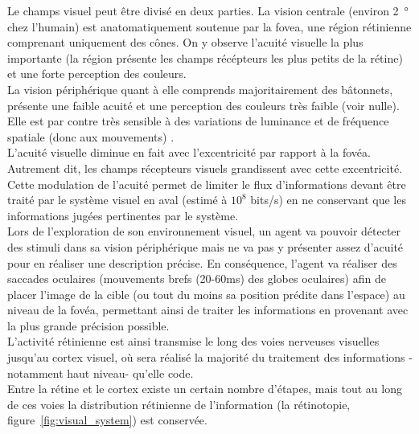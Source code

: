 Le champs visuel peut être divisé en deux parties. La vision centrale (environ \SI{2}{\degree} chez l'humain) est anatomatiquement soutenue par la fovea, une région rétinienne comprenant uniquement des cônes. On y observe l'acuité visuelle la plus importante (la région présente les champs récépteurs les plus petits de la rétine) et une forte perception des couleurs.\autocite{Werner2014}\\
La vision périphérique quant à elle comprends majoritairement des bâtonnets, présente une faible acuité et une perception des couleurs très faible (voir nulle). Elle est par contre très sensible à des variations de luminance et de fréquence spatiale (donc aux mouvements) \autocite{Werner2014}.\\
 L'acuité visuelle diminue en fait avec l'excentricité par rapport à la fovéa. Autrement dit, les champs récepteurs visuels grandissent avec cette excentricité. Cette modulation de l'acuité permet de limiter le flux d'informations devant être traité par le système visuel en aval (estimé à $10^8$ bits/s) en ne conservant que les informations jugées pertinentes par le système.\autocite{Werner2014, Itti2000}\\
Lors de l'exploration de son environnement visuel, un agent va pouvoir détecter des stimuli dans sa vision périphérique mais ne va pas y présenter assez d'acuité pour en réaliser une description précise.
En conséquence, l'agent va réaliser des saccades oculaires (mouvements brefs (20-60\si{\milli\second}) des globes oculaires) afin de placer l'image de la cible (ou tout du moins sa position prédite dans l'espace) au niveau de la fovéa, permettant ainsi de traiter les informations en provenant avec la plus grande précision possible.\autocite{Werner2014}\\

L'activité rétinienne est ainsi transmise le long des voies nerveuses visuelles jusqu'au cortex visuel, où sera réalisé la majorité du traitement des informations -notamment haut niveau- qu'elle code.\autocite{Werner2014} \\
Entre la rétine et le cortex existe un certain nombre d'étapes, mais tout au long de ces voies la distribution rétinienne de l'information (la rétinotopie, figure~\ref{fig:visual_system}) est conservée.\autocite{Werner2014}\\

